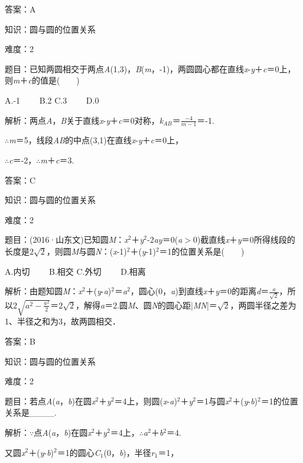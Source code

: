 \documentclass{article} %
\begin{document}
答案：A

知识：圆与圆的位置关系

难度：2

题目：已知两圆相交于两点\textit{A}(1,3)，\textit{B}(\textit{m}，-1)，两圆圆心都在直线\textit{x}-\textit{y}＋\textit{c}＝0上，则\textit{m}＋\textit{c}的值是(　　)

A.-1　　 B.2 C.3　　 D.0

解析：两点\textit{A}，\textit{B}关于直线\textit{x}-\textit{y}＋\textit{c}＝0对称，\textit{k${}_{AB}$}＝$\frac{-4}{m-1}$＝-1.

$\mathrm{\therefore}$\textit{m}＝5，线段\textit{AB}的中点(3,1)在直线\textit{x}-\textit{y}＋\textit{c}＝0上，

$\mathrm{\therefore}$\textit{c}＝-2，$\mathrm{\therefore}$\textit{m}＋\textit{c}＝3.

答案：C

知识：圆与圆的位置关系

难度：2

题目：(2016·山东文)已知圆\textit{M}：\textit{x}${}^{2}$＋\textit{y}${}^{2}$-2\textit{ay}＝0(\textit{a}$\mathrm{>}$0)截直线\textit{x}＋\textit{y}＝0所得线段的长度是$2\sqrt{2}$，则圆\textit{M}与圆\textit{N}：(\textit{x}-1)${}^{2}$＋(\textit{y}-1)${}^{2}$＝1的位置关系是(　　)

A.内切　　 B.相交 C.外切　　 D.相离

解析：由题知圆\textit{M}：\textit{x}${}^{2}$＋(\textit{y}-\textit{a})${}^{2}$＝\textit{a}${}^{2}$，圆心(0，\textit{a})到直线\textit{x}＋\textit{y}＝0的距离\textit{d}＝$\frac{a}{\sqrt{2}}$，所以$2\sqrt{a^2-\frac{a^2}{2}}$＝$2\sqrt{2}$，解得\textit{a}＝2.圆\textit{M}、圆\textit{N}的圆心距|\textit{MN}|＝$\sqrt{2}$，两圆半径之差为1、半径之和为3，故两圆相交．

答案：B


知识：圆与圆的位置关系

难度：2

题目：若点\textit{A}(\textit{a}，\textit{b})在圆\textit{x}${}^{2}$＋\textit{y}${}^{2}$＝4上，则圆(\textit{x}-\textit{a})${}^{2}$＋\textit{y}${}^{2}$＝1与圆\textit{x}${}^{2}$＋(\textit{y}-\textit{b})${}^{2}$＝1的位置关系是\_\_\_\_.

解析：$\mathrm{\because}$点\textit{A}(\textit{a}，\textit{b})在圆\textit{x}${}^{2}$＋\textit{y}${}^{2}$＝4上，$\mathrm{\therefore}$\textit{a}${}^{2}$＋\textit{b}${}^{2}$＝4.

又圆\textit{x}${}^{2}$＋(\textit{y}-\textit{b})${}^{2}$＝1的圆心\textit{C}${}_{1}$(0，\textit{b})，半径\textit{r}${}_{1}$＝1，
\end{document}
